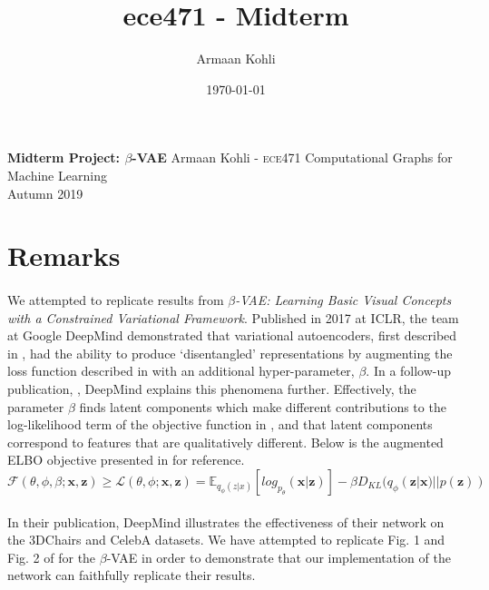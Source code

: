 \documentclass[justified,nobib]{tufte-handout}
\title{ece471 - Midterm}
\author{Armaan Kohli}
\date{\today}
\begin{document}
\begin{fullwidth}
{
  \noindent\fontsize{12pt}{20pt}\selectfont\textbf{Midterm Project: $\beta$-VAE}
  \newline
  \fontsize{12pt}{18pt}\selectfont
  {Armaan Kohli - \scshape ece}471 Computational Graphs for Machine Learning \\Autumn 2019\\
}
\raggedright
\raggedbottom
\section{Remarks}
\paragraph{} We attempted to replicate results from \textit{$\beta$-VAE: Learning Basic Visual Concepts with a Constrained Variational Framework}\cite{bvae}. Published in 2017 at ICLR, the team at Google DeepMind demonstrated that variational autoencoders, first described in \cite{vae}, had the ability to produce `disentangled' representations by augmenting the loss function described in \citep{vae} with an additional hyper-parameter, $\beta$. In a follow-up publication, \cite{bvae-dis}, DeepMind explains this phenomena further. Effectively, the parameter $\beta$ finds latent components which make different contributions to the log-likelihood term of the objective function in \citep{vae}, and that latent components correspond to features that are qualitatively different. Below is the augmented ELBO objective presented in \citep{bvae} for reference.
\begin{equation}
\mathcal{F}(\theta,\phi,\beta;\bm{x},\bm{z}) \geq \mathcal{L}(\theta,\phi;\bm{x},\bm{z}) = \mathbb{E}_{q_{\phi}(z|x)}[log_{p_{\theta}}(\bm{x}|\bm{z})]-\beta D_{KL}(q_{\phi}(\bm{z}|\bm{x})||p(\bm{z}))
\end{equation}


\paragraph{} In their publication, DeepMind illustrates the effectiveness of their network on the 3DChairs and CelebA datasets. We have attempted to replicate Fig. 1 and Fig. 2 of \citep{bvae} for the $\beta$-VAE in order to demonstrate that our implementation of the network can faithfully replicate their results. 


\end{fullwidth}
\end{document}
